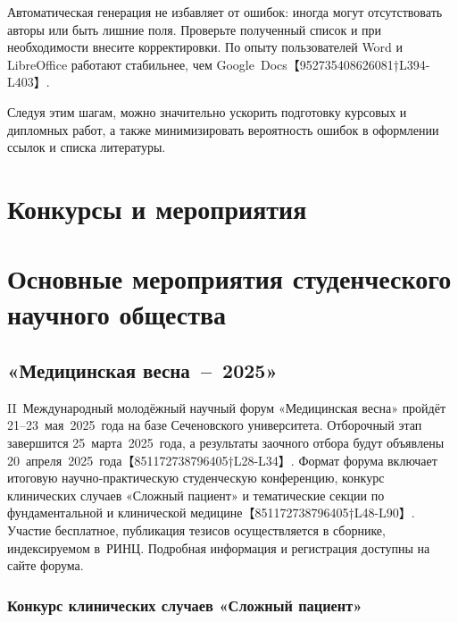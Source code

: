 \documentclass[
  russian,
  letterpaper,
]{book}
\begin{document}
Автоматическая генерация не избавляет от ошибок: иногда могут
отсутствовать авторы или быть лишние поля. Проверьте полученный список и
при необходимости внесите корректировки. По опыту пользователей Word и
LibreOffice работают стабильнее, чем
Google~Docs【952735408626081†L394-L403】.

Следуя этим шагам, можно значительно ускорить подготовку курсовых и
дипломных работ, а также минимизировать вероятность ошибок в оформлении
ссылок и списка литературы.

\chapter{Конкурсы и
мероприятия}\label{ux43aux43eux43dux43aux443ux440ux441ux44b-ux438-ux43cux435ux440ux43eux43fux440ux438ux44fux442ux438ux44f}

\chapter{Основные мероприятия студенческого научного
общества}\label{sec-competitions}

\section{«Медицинская
весна~--~2025»}\label{ux43cux435ux434ux438ux446ux438ux43dux441ux43aux430ux44f-ux432ux435ux441ux43dux430-2025}

II~Международный молодёжный научный форум «Медицинская весна» пройдёт
21--23~мая~2025~года на базе Сеченовского университета. Отборочный этап
завершится 25~марта~2025~года, а результаты заочного отбора будут
объявлены 20~апреля~2025~года【851172738796405†L28-L34】. Формат форума
включает итоговую научно‑практическую студенческую конференцию, конкурс
клинических случаев «Сложный пациент» и тематические секции по
фундаментальной и клинической медицине【851172738796405†L48-L90】.
Участие бесплатное, публикация тезисов осуществляется в сборнике,
индексируемом в~РИНЦ. Подробная информация и регистрация доступны на
сайте форума.

\subsection{Конкурс клинических случаев «Сложный
пациент»}\label{ux43aux43eux43dux43aux443ux440ux441-ux43aux43bux438ux43dux438ux447ux435ux441ux43aux438ux445-ux441ux43bux443ux447ux430ux435ux432-ux441ux43bux43eux436ux43dux44bux439-ux43fux430ux446ux438ux435ux43dux442}
\end{document}
